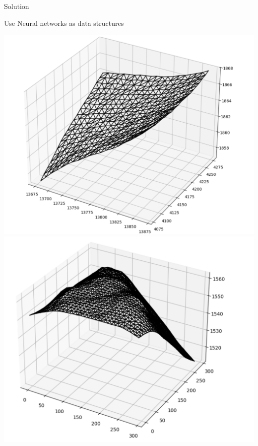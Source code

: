 \begin{frame}{Solution}
    \begin{center}
        Use Neural networks as data structures 
    \end{center}
    \begin{center}
        \includegraphics[scale=.2]{images/trig1.png}
        \includegraphics[scale=.2]{images/trig2.png}
    \end{center}

\end{frame}

